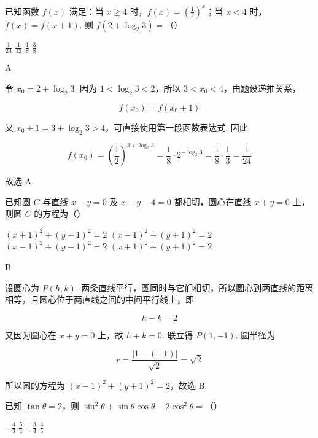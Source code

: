 \begin{problem}
已知函数 \( f(x) \) 满足：当 \( x \geqslant 4 \) 时，\( f(x) = \left(\frac{1}{2}\right)^x \)；当 \( x < 4 \) 时，\( f(x) = f(x + 1) \). 则 \( f(2 + \log_2 3) = \)（\quad）

\choices
    {\(\frac{1}{24}\)}
    {\(\frac{1}{12}\)}
    {\(\frac{1}{8}\)}
    {\(\frac{3}{8}\)}
\end{problem}

\begin{answer}
A
\end{answer}

\begin{solution}
令 \(x_0=2+\log_2 3\). 因为 \(1<\log_2 3<2\)，所以 \(3<x_0<4\)，由题设递推关系，

\[
f(x_0)=f(x_0+1)
\]

又 \(x_0+1=3+\log_2 3>4\)，可直接使用第一段函数表达式. 因此

\[
f(x_0)=\left(\frac12\right)^{3+\log_2 3}
 =\frac18\cdot2^{-\log_2 3}
 =\frac18\cdot\frac13=\frac1{24}
\]

故选 A.
\end{solution}

\begin{problem}
已知圆 \(C\) 与直线 \(x - y = 0\) 及 \(x - y - 4 = 0\) 都相切，圆心在直线 \(x + y = 0\) 上，则圆 \(C\) 的方程为（\quad）

\choices
    {\((x + 1)^2 +(y - 1)^2 = 2\)}
    {\((x - 1)^{2} + (y + 1)^{2} = 2\)}
    {\((x - 1)^{2} + (y - 1)^{2} = 2\)}
    {\((x + 1)^{2} + (y + 1)^{2} = 2\)}
\end{problem}

\begin{answer}
    B
\end{answer}

\begin{solution}
设圆心为 \(P(h,k)\). 两条直线平行，圆同时与它们相切，所以圆心到两直线的距离相等，且圆心位于两直线之间的中间平行线上，即

\[
h-k=2
\]

又因为圆心在 \(x+y=0\) 上，故 \(h+k=0\). 联立得 \(P(1,-1)\). 圆半径为

\[
r=\frac{|1-(-1)|}{\sqrt2}=\sqrt2
\]

所以圆的方程为 \((x-1)^2+(y+1)^2=2\)，故选 B.
\end{solution}

\begin{problem}
已知 \(\tan \theta = 2\)，则 \(\sin^2\theta + \sin \theta \cos \theta - 2\cos^2\theta =\)（\quad）

\choices
    {\(-\frac{4}{3}\)}
    {\( \frac{5}{4} \)}
    {\(-\frac{3}{4}\)}
    {\(\frac{4}{5}\)}
\end{problem}

